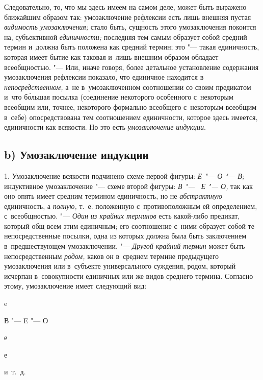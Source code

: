 Следовательно, то, что мы здесь имеем на самом деле, может
быть выражено ближайшим образом так: умозаключение рефлексии есть лишь
внешняя пустая {\em видимость
умозаключения;} стало быть, сущность этого умозаключения
покоится на, субъективной {\em единичности;}
последняя тем самым образует собой средний термин и~должна
быть положена как средний термин; это "--- такая единичность,
которая имеет бытие как таковая и~лишь внешним образом обладает
всеобщностью. "--- Или, иначе говоря, более детальное
установление содержания умозаключения рефлексии показало, что единичное
находится в {\em непосредственном,}
а~не в~умозаключенном соотношении со своим предикатом и~что
б\'{о}льшая посылка (соединение некоторого особенного с~некоторым всеобщим или,
точнее, некоторого формально всеобщего с~некоторым всеобщим в~себе)
опосредствована тем соотношением единичности, которое здесь имеется,
единичности как всякости. Но это есть {\em умозаключение индукции}.

\subsection[b) Умозаключение индукции]{b) Умозаключение индукции}

1. Умозаключение всякости подчинено схеме первой фигуры:
{\em Е "--- О "--- В;} индуктивное умозаключение "--- схеме второй
фигуры: {\em В "--- ~Е "--- О,} так как оно опять имеет средним термином
единичность, но не {\em абстрактную} единичность, а {\em полную,} т.~е.
положенную с~противоположным ей определением,
с~всеобщностью. "--- {\em Один из крайних терминов} есть какой-либо предикат,
который общ всем этим единичным; его соотношение с~ними образует собой
те непосредственные посылки, одна из которых должна была быть заключением
в~предшествующем умозаключении. "--- {\em Другой крайний термин}
может быть непосредственным {\em родом,} каков он в~среднем термине
предыдущего умозаключения или в~субъекте универсального
суждения, родом, который исчерпан в~совокупности единичных или же видов
среднего термина. Согласно этому, умозаключение имеет следующий вид:

{\centering
e
\par}

{\centering
В "--- E "--- О
\par}

{\centering
е
\par}

{\centering
е
\par}

{\centering
и~т.~д.
\par}


